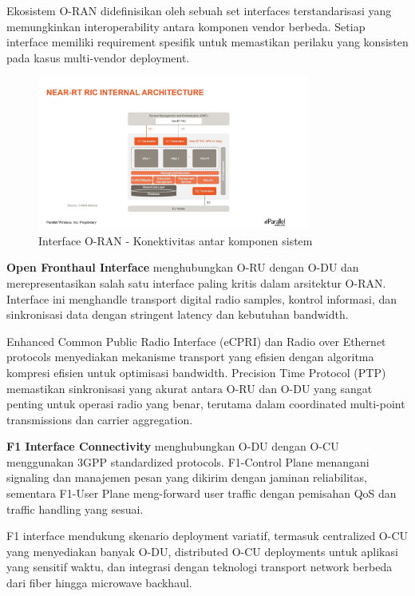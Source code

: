 Ekosistem O-RAN didefinisikan oleh sebuah set interfaces terstandarisasi yang memungkinkan interoperability antara komponen vendor berbeda. Setiap interface memiliki requirement spesifik untuk memastikan perilaku yang konsisten pada kasus multi-vendor deployment.

\begin{figure}[htbp]
    \centering
    \includegraphics[width=0.8\textwidth]{assets/pics/bab3_12.png}
    \caption{Interface O-RAN - Konektivitas antar komponen sistem}
    \label{fig:oran_interfaces}
\end{figure}

\textbf{Open Fronthaul Interface} menghubungkan O-RU dengan O-DU dan merepresentasikan salah satu interface paling kritis dalam arsitektur O-RAN. Interface ini menghandle transport digital radio samples, kontrol informasi, dan sinkronisasi data dengan stringent latency dan kebutuhan bandwidth.

Enhanced Common Public Radio Interface (eCPRI) dan Radio over Ethernet protocols menyediakan mekanisme transport yang efisien dengan algoritma kompresi efisien untuk optimisasi bandwidth. Precision Time Protocol (PTP) memastikan sinkronisasi yang akurat antara O-RU dan O-DU yang sangat penting untuk operasi radio yang benar, terutama dalam coordinated multi-point transmissions dan carrier aggregation.

\textbf{F1 Interface Connectivity} menghubungkan O-DU dengan O-CU menggunakan 3GPP standardized protocols. F1-Control Plane menangani signaling dan manajemen pesan yang dikirim dengan jaminan reliabilitas, sementara F1-User Plane meng-forward user traffic dengan pemisahan QoS dan traffic handling yang sesuai.

F1 interface mendukung skenario deployment variatif, termasuk centralized O-CU yang menyediakan banyak O-DU, distributed O-CU deployments untuk aplikasi yang sensitif waktu, dan integrasi dengan teknologi transport network berbeda dari fiber hingga microwave backhaul.

